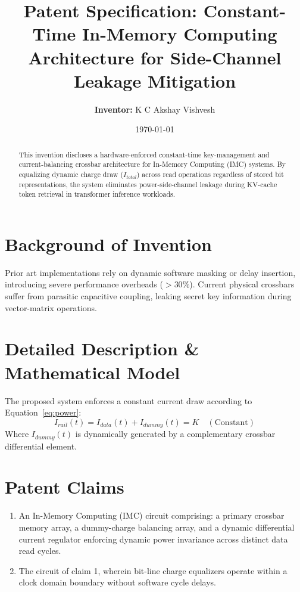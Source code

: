 \documentclass[11pt,a4paper]{article}
\title{\textbf{Patent Specification: Constant-Time In-Memory Computing Architecture for Side-Channel Leakage Mitigation}}
\author{\textbf{Inventor:} K C Akshay Vishvesh}
\date{\today}
\begin{document}
\maketitle

\begin{abstract}
This invention discloses a hardware-enforced constant-time key-management and current-balancing crossbar architecture for In-Memory Computing (IMC) systems. By equalizing dynamic charge draw ($I_{total}$) across read operations regardless of stored bit representations, the system eliminates power-side-channel leakage during KV-cache token retrieval in transformer inference workloads.
\end{abstract}

\section{Background of Invention}
Prior art implementations rely on dynamic software masking or delay insertion, introducing severe performance overheads ($>30\%$). Current physical crossbars suffer from parasitic capacitive coupling, leaking secret key information during vector-matrix operations.

\section{Detailed Description \& Mathematical Model}
The proposed system enforces a constant current draw according to Equation~\ref{eq:power}:
\begin{equation}
I_{rail}(t) = I_{data}(t) + I_{dummy}(t) = K \quad (\text{Constant})
\label{eq:power}
\end{equation}
Where $I_{dummy}(t)$ is dynamically generated by a complementary crossbar differential element.

\section{Patent Claims}
\begin{enumerate}
    \item An In-Memory Computing (IMC) circuit comprising:
    a primary crossbar memory array, a dummy-charge balancing array, and a dynamic differential current regulator enforcing dynamic power invariance across distinct data read cycles.
    \item The circuit of claim 1, wherein bit-line charge equalizers operate within a clock domain boundary without software cycle delays.
\end{enumerate}
\end{document}
